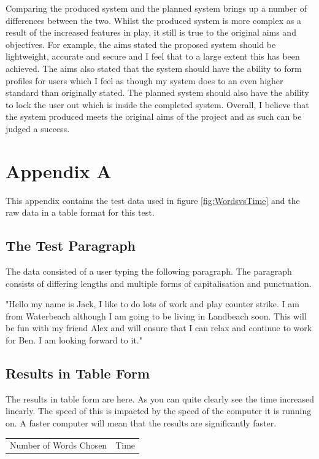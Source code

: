 \documentclass[10pt,a4paper]{report}
\begin{document}
Comparing the produced system and the planned system brings up a number of differences between the two. Whilst the produced system is more complex as a result of the increased features in play, it still is true to the original aims and objectives. For example, the aims stated the proposed system should be lightweight, accurate and secure and I feel that to a large extent this has been achieved. The aims also stated that the system should have the ability to form profiles for users which I feel as though my system does to an even higher standard than originally stated. The planned system should also have the ability to lock the user out which is inside the completed system. Overall, I believe that the system produced meets the original aims of the project and as such can be judged a success.



\chapter*{Appendix A}

This appendix contains the test data used in figure \ref{fig:WordsvsTime} and the raw data in a table format for this test.

\section*{The Test Paragraph}
The data consisted of a user typing the following paragraph. The paragraph consists of differing lengths and multiple forms of capitalisation and punctuation.

"Hello my name is Jack, I like to do lots of work and play counter strike. I am from Waterbeach although I am going to be living in Landbeach soon. This will be fun with my friend Alex and will ensure that I can relax and continue to work for Ben. I am looking forward to it."

\section*{Results in Table Form}
The results in table form are here. As you can quite clearly see the time increased linearly. The speed of this is impacted by the speed of the computer it is running on. A faster computer will mean that the results are significantly faster.

\begin{center}
	\begin{tabular}{|c|c|}
		Number of Words Chosen & Time \\
	\end{tabular}
\end{center}
\end{document}
